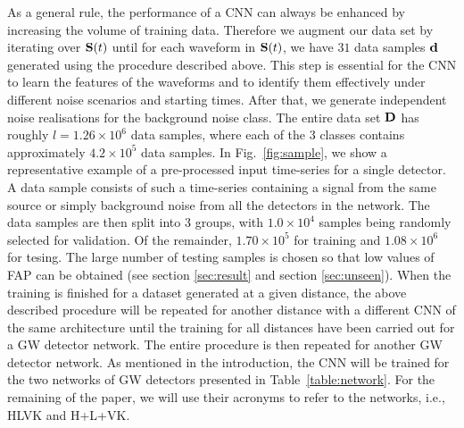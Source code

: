 \documentclass[aps,twocolumn,showpacs,groupedaddress, nofootinbib]{revtex4}  %
\newcommand{\cm}[1]{\textbf{\textcolor{red}{CM: #1}}}
\begin{document}
%
%
As a general rule, the performance of a \ac{CNN} can always be enhanced by
increasing the volume of training data. Therefore we augment our data set by
iterating over $\bold{S}(t)$ until for each waveform in $\bold{S}(t)$, we have
$31$ data samples $\bold{d}$ generated using the procedure described above.
This step is essential for the \ac{CNN} to learn the features of the waveforms
and to identify them effectively under different noise scenarios and starting
times.  After that, we generate independent noise realisations for the
background noise class. The entire data set $\bold{D}$ has
roughly $l = 1.26 \times 10^{6}$ data samples, where each of the 3 classes
contains approximately $4.2\times10^{5}$ data samples.
%
%
%
%
In Fig.~\ref{fig:sample}, we show a representative example of a pre-processed
input time-series for a single detector. A data sample consists of such a
time-series containing a signal from the same source or simply background noise
from all the detectors in the network. The data samples are then split into 3
groups, with $1.0\times10^{4}$ samples being randomly selected for validation.
Of the remainder, $1.70\times10^{5}$ for training and $1.08\times10^{6}$ for tesing. 
The large number of testing samples is chosen so that low values of \ac{FAP} can be obtained 
(see section \ref{sec:result} and section \ref{sec:unseen}).
When the training is finished for a dataset generated at a given distance, the above described
procedure will be repeated for another distance with a different \ac{CNN} of 
the same architecture until the training for all
distances have been carried out for a \ac{GW} detector network. The entire
procedure is then repeated for another \ac{GW} detector network. 
As mentioned in the introduction, the \ac{CNN} will be trained for the two networks of
\ac{GW} detectors presented in Table~\ref{table:network}. For the remaining of
the paper, we will use their acronyms to refer to the networks, i.e., HLVK and H+L+VK.
\end{document}
